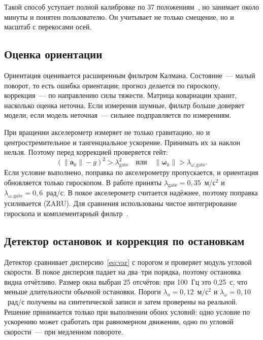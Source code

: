 \documentclass{misisarticle}
\begin{document}
Такой способ уступает полной калибровке по 37 положениям~\cite{tedaldi}, но занимает около минуты и понятен пользователю. Он учитывает не только смещение, но и масштаб с перекосами осей.

\subsection{Оценка ориентации}

Ориентация оценивается расширенным фильтром Калмана. Состояние~--- малый поворот, то есть ошибка ориентации; прогноз делается по гироскопу, коррекция~--- по направлению силы тяжести. Матрица ковариации хранит, насколько оценка неточна. Если измерения шумные, фильтр больше доверяет модели, если модель неточная~--- сильнее подправляется по измерениям.

При вращении акселерометр измеряет не только гравитацию, но и центростремительное и тангенциальное ускорение. Принимать их за наклон нельзя. Поэтому перед коррекцией проверяется гейт:
\begin{equation}
\left(\|\mathbf a_k\|-g\right)^2>\lambda_{\text{gate}}^2
\quad\text{или}\quad
\|\boldsymbol\omega_k\|>\lambda_{\omega,\text{gate}}.
\label{eq:gate}
\end{equation}
Если условие выполнено, поправка по акселерометру пропускается, и ориентация обновляется только гироскопом. В работе приняты $\lambda_{\text{gate}}=0{,}35$~м/с$^2$ и $\lambda_{\omega,\text{gate}}=0{,}6$~рад/с. В покое акселерометр считается надёжнее, поэтому поправка усиливается (ZARU). Для сравнения использованы чистое интегрирование гироскопа и комплементарный фильтр~\cite{mahony}.

\subsection{Детектор остановок и коррекция по остановкам}

Детектор сравнивает дисперсию~\eqref{eq:var} с порогом и проверяет модуль угловой скорости. В покое дисперсия падает на два--три порядка, поэтому остановка видна отчётливо. Размер окна выбран 25 отсчётов: при 100~Гц это 0,25~с, что меньше длительности обычной остановки. Пороги $\lambda_a=0{,}12$~м/с$^2$ и $\lambda_\omega=0{,}10$~рад/с получены на синтетической записи и затем проверены на реальной. Решение принимается только при выполнении обоих условий: одно условие по ускорению может сработать при равномерном движении, одно по угловой скорости~--- при медленном повороте.
\end{document}
